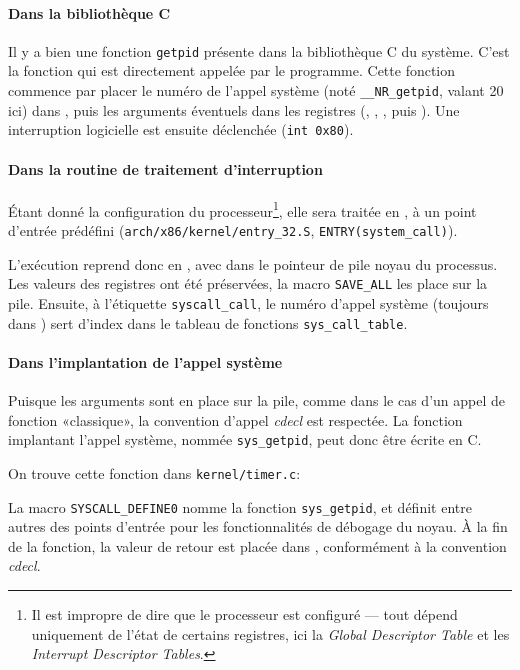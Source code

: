\paragraph{Dans la bibliothèque C}

Il y a bien une fonction \texttt{getpid} présente dans la bibliothèque C du
système. C'est la fonction qui est directement appelée par le programme. Cette
fonction commence par placer le numéro de l'appel système (noté
\texttt{\_\_NR\_getpid}, valant 20 ici) dans \eax, puis les arguments éventuels
dans les registres (\ebx, \ecx, \edx, \esi{} puis \edi). Une interruption
logicielle est ensuite déclenchée (\verb!int 0x80!).

\paragraph{Dans la routine de traitement d'interruption}

Étant donné la configuration du processeur\footnote{Il est impropre de dire que
le processeur est configuré --- tout dépend uniquement de l'état de certains
registres, ici la \emph{Global Descriptor Table} et les \emph{Interrupt
Descriptor Tables}.}, elle sera traitée en , à un point d'entrée
prédéfini (\verb!arch/x86/kernel/entry_32.S!, \verb!ENTRY(system_call)!).


L'exécution reprend donc en , avec dans \esp{} le pointeur de pile noyau
du processus. Les valeurs des registres ont été préservées, la macro
\texttt{SAVE\_ALL} les place sur la pile. Ensuite, à l'étiquette
\texttt{syscall\_call}, le numéro d'appel système (toujours dans \eax) sert
d'index dans le tableau de fonctions \texttt{sys\_call\_table}.


\paragraph{Dans l'implantation de l'appel système}

Puisque les arguments sont en place sur la pile, comme dans le cas d'un appel de
fonction «classique», la convention d'appel \emph{cdecl} est respectée. La
fonction implantant l'appel système, nommée \texttt{sys\_getpid}, peut donc être
écrite en C.

On trouve cette fonction dans \texttt{kernel/timer.c}:


La macro \texttt{SYSCALL_DEFINE0} nomme la fonction \texttt{sys\_getpid}, et
définit entre autres des points d'entrée pour les fonctionnalités de débogage du
noyau. À la fin de la fonction, la valeur de retour est placée dans \eax,
conformément à la convention \emph{cdecl}.

